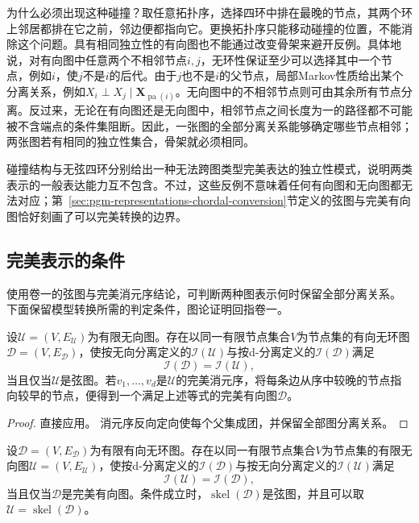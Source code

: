 为什么必须出现这种碰撞？取任意拓扑序，选择四环中排在最晚的节点，其两个环上邻居都排在它之前，邻边便都指向它。更换拓扑序只能移动碰撞的位置，不能消除这个问题。具有相同独立性的有向图也不能通过改变骨架来避开反例。具体地说，对有向图中任意两个不相邻节点$i,j$，无环性保证至少可以选择其中一个节点，例如$i$，使$j$不是$i$的后代。由于$j$也不是$i$的父节点，局部Markov性质给出某个分离关系，例如$X_i\perp X_j\mid\bm{X}_{\operatorname{pa}(i)}$。无向图中的不相邻节点则可由其余所有节点分离。反过来，无论在有向图还是无向图中，相邻节点之间长度为一的路径都不可能被不含端点的条件集阻断。因此，一张图的全部分离关系能够确定哪些节点相邻；两张图若有相同的独立性集合，骨架就必须相同。

碰撞结构与无弦四环分别给出一种无法跨图类型完美表达的独立性模式，说明两类表示的一般表达能力互不包含。不过，这些反例不意味着任何有向图和无向图都无法对应；第~\ref{sec:pgm-representations-chordal-conversion}节定义的弦图与完美有向图恰好刻画了可以完美转换的边界。

\subsection{完美表示的条件}
\label{sec:pgm-representations-perfect-dags}

使用卷一的弦图与完美消元序结论，可判断两种图表示何时保留全部分离关系。
下面保留模型转换所需的判定条件，图论证明回指卷一。

\begin{theorem}[无向图的完美有向图表示]
  \label{thm:pgm-representations-chordal-perfect}
  设$\mathcal{U}=(V,E_{\mathcal U})$为有限无向图。存在以同一有限节点集合$V$为节点集的有向无环图$\mathcal{D}=(V,E_{\mathcal D})$，使按无向分离定义的$\mathcal{I}(\mathcal{U})$与按d-分离定义的$\mathcal{I}(\mathcal{D})$满足
  \[
    \mathcal{I}(\mathcal{D})=\mathcal{I}(\mathcal{U}),
  \]
  当且仅当$\mathcal{U}$是弦图。若$v_1,\ldots,v_d$是$\mathcal{U}$的完美消元序，将每条边从序中较晚的节点指向较早的节点，便得到一个满足上述等式的完美有向图$\mathcal{D}$。
\end{theorem}

\begin{proof}
直接应用。
消元序反向定向使每个父集成团，并保留全部图分离关系。
\end{proof}

\begin{theorem}[有向图的完美无向图表示]
  \label{thm:pgm-representations-perfect-undirected}
  设$\mathcal{D}=(V,E_{\mathcal D})$为有限有向无环图。存在以同一有限节点集合$V$为节点集的有限无向图$\mathcal{U}=(V,E_{\mathcal U})$，使按d-分离定义的$\mathcal{I}(\mathcal{D})$与按无向分离定义的$\mathcal{I}(\mathcal{U})$满足
  \[
    \mathcal{I}(\mathcal{U})=\mathcal{I}(\mathcal{D}),
  \]
  当且仅当$\mathcal{D}$是完美有向图。条件成立时，$\operatorname{skel}(\mathcal{D})$是弦图，并且可以取$\mathcal{U}=\operatorname{skel}(\mathcal{D})$。
\end{theorem}

